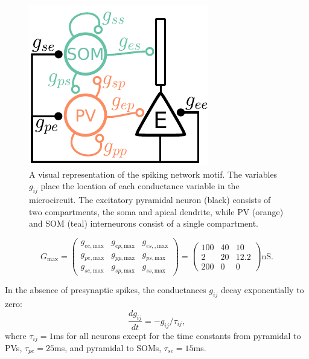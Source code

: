 \documentclass[a4paper,10pt]{article}
\begin{document}
\begin{figure}[ht!]
\centering
\includegraphics[width=.3\textwidth]{spiking_conn2.pdf}
\caption{A visual representation of the spiking network motif. The variables $g_{ij}$ place the location of each conductance variable in the microcircuit. The excitatory pyramidal neuron (black) consists of two compartments, the soma and apical dendrite, while PV (orange) and SOM (teal) interneurons consist of a single compartment.}\label{fig:spike}
\end{figure}

\begin{equation}\label{eq:cond}
 G_{\text{max}} = \left(\begin{matrix}
  g_{ee,\text{max}} & g_{ep,\text{max}}  & g_{es,,\text{max}} \\
  g_{pe,\text{max}}  & g_{pp,\text{max}}  & g_{ps,\text{max}} \\
  g_{se,\text{max}} & g_{sp,\text{max}}  & g_{ss,\text{max}} 
 \end{matrix}\right)= \left(\begin{matrix}
  100  & 40  & 10 \\
  2  & 20  & 12.2 \\
  200  & 0  & 0 
 \end{matrix}\right)\text{nS}.
\end{equation}

In the absence of presynaptic spikes, the conductances $g_{ij}$ decay exponentially to zero:
\begin{equation*}
 \frac{dg_{ij}}{dt} = -g_{ij}/\tau_{ij},
\end{equation*}
where $\tau_{ij} = 1$ms for all neurons except for the time constants from pyramidal to PVs, $\tau_{pe} = 25$ms, and pyramidal to SOMs, $\tau_{se} = 15$ms.
\end{document}
